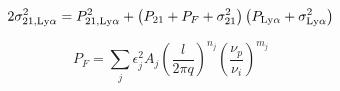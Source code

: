 

\begin{equation}
    2 \sigma^2_{21, \rm Ly\alpha} = P^2_{21, \rm Ly\alpha} +
      \left(P_{21} + P_{F} + \sigma^2_{21} \right) \left( P_{\rm Ly\alpha} + \sigma_{\rm Ly\alpha}^2\right)
\end{equation}

\begin{equation}
    P_F = \sum_{j} \epsilon_j^2 A_j \left( \frac{l}{2 \pi q} \right)^{n_j} \left( \frac{\nu_p}{\nu_i}\right)^{m_j}
\end{equation}
